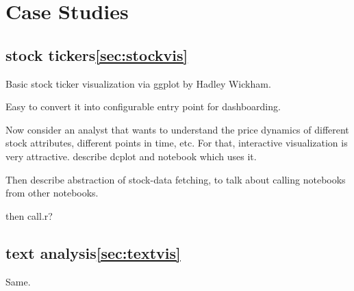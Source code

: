 \section{Case Studies}

\subsection{stock tickers\ref{sec:stockvis}}

Basic stock ticker visualization via ggplot by Hadley Wickham.

Easy to convert it into configurable entry point for dashboarding.

Now consider an analyst that wants to understand the price dynamics of
different stock attributes, different points in time, etc. For that,
interactive visualization is very attractive. describe dcplot and
notebook which uses it.

Then describe abstraction of stock-data fetching, to talk about
calling notebooks from other notebooks.

then call.r?

\subsection{text analysis\ref{sec:textvis}}

Same.

%
